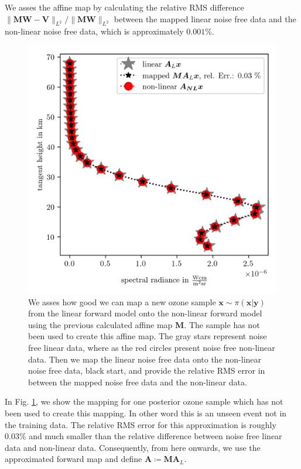 We asses the affine map by calculating the relative RMS difference $\lVert \bm{M}\bm{W} - \bm{V}  \rVert_{L^2} / \lVert \bm{M}\bm{W} \rVert_{L^2} $ between the mapped linear noise free data and the non-linear noise free data, which is approximately $0.001\%$.
\begin{figure}[ht!]
	\centering
	\includegraphics{SampMapAssesmentTT.png}
	\caption[Assessment of affine map.]{We asses how good we can map a new ozone sample $\bm{x} \sim \pi(\bm{x}|\bm{y})$ from the linear forward model onto the non-linear forward model using the previous calculated affine map $\bm{M}$. The sample has not been used to create this affine map. The gray stars represent noise free linear data, where as the red circles present noise free non-linear data. Then we map the linear noise free data onto the non-linear noise free data, black start, and provide the relative RMS error in between the mapped noise free data and the non-linear data.}
	\label{fig:MapAsses}
\end{figure}
In Fig. \ref{fig:MapAsses}, we show the mapping for one posterior ozone sample which has not been used to create this mapping.
In other word this is an unseen event not in the training data.
The relative RMS error for this approximation is roughly $0.03\%$ and much smaller than the relative difference between noise free linear data and non-linear data.
Consequently, from here onwards, we use the approximated forward map and define $\bm{A} \coloneqq \bm{M A}_L $.
\clearpage

